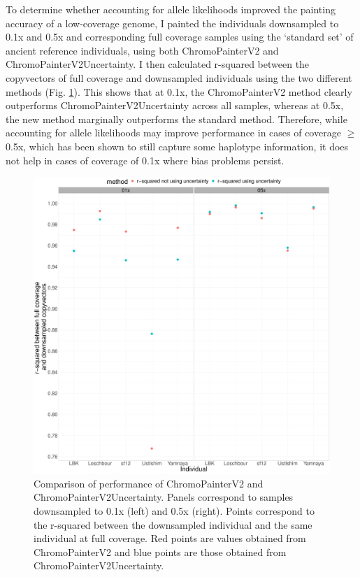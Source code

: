 To determine whether accounting for allele likelihoods improved the painting accuracy of a low-coverage genome, I painted the individuals downsampled to 0.1x and 0.5x and corresponding full coverage samples using the `standard set' of ancient reference individuals, using both ChromoPainterV2 and ChromoPainterV2Uncertainty. I then calculated r-squared between the copyvectors of full coverage and downsampled individuals using the two different methods (Fig. \ref{fig:uncertainty_v_noUncertainty_0.5x_0.1x}). This shows that at 0.1x, the ChromoPainterV2 method clearly outperforms ChromoPainterV2Uncertainty across all samples, whereas at 0.5x, the new method marginally outperforms the standard method. {\color{red}Therefore, while accounting for allele likelihoods may improve performance in cases of coverage $\geq$0.5x, which has been shown to still capture some haplotype information, it does not help in cases of coverage of 0.1x where bias problems persist.}


\begin{figure}[htp]
    \centering
    \includegraphics[width=1.0\textwidth]{../images/chapter1/uncertainty_v_noUncertainty_0.5x_0.1x.pdf}
    \caption{Comparison of performance of ChromoPainterV2 and ChromoPainterV2Uncertainty. Panels correspond to samples downsampled to 0.1x (left) and 0.5x (right). Points correspond to the r-squared between the downsampled individual and the same individual at full coverage. Red points are values obtained from ChromoPainterV2 and blue points are those obtained from ChromoPainterV2Uncertainty.}
    \label{fig:uncertainty_v_noUncertainty_0.5x_0.1x}
\end{figure}


